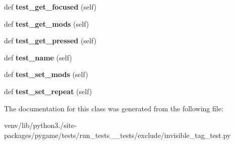 \begin{DoxyCompactItemize}
\item 
\mbox{\label{classpygame_1_1tests_1_1run__tests____tests_1_1exclude_1_1invisible__tag__test_1_1_key_module_test_a1f0f7232340ffbfc27aa881cff69fd75}} 
def {\bfseries test\+\_\+get\+\_\+focused} (self)
\item 
\mbox{\label{classpygame_1_1tests_1_1run__tests____tests_1_1exclude_1_1invisible__tag__test_1_1_key_module_test_ac4b4e299e197507a4015d1b2462cda31}} 
def {\bfseries test\+\_\+get\+\_\+mods} (self)
\item 
\mbox{\label{classpygame_1_1tests_1_1run__tests____tests_1_1exclude_1_1invisible__tag__test_1_1_key_module_test_a3667dfa3751e0672fe489a5ae988f2a2}} 
def {\bfseries test\+\_\+get\+\_\+pressed} (self)
\item 
\mbox{\label{classpygame_1_1tests_1_1run__tests____tests_1_1exclude_1_1invisible__tag__test_1_1_key_module_test_ae739eb93c36af68747980ecf5f705128}} 
def {\bfseries test\+\_\+name} (self)
\item 
\mbox{\label{classpygame_1_1tests_1_1run__tests____tests_1_1exclude_1_1invisible__tag__test_1_1_key_module_test_a95a69e6cbf4de7dc4fcfc860b4041f03}} 
def {\bfseries test\+\_\+set\+\_\+mods} (self)
\item 
\mbox{\label{classpygame_1_1tests_1_1run__tests____tests_1_1exclude_1_1invisible__tag__test_1_1_key_module_test_a51726d9adb7dab186830d59ad637653a}} 
def {\bfseries test\+\_\+set\+\_\+repeat} (self)
\end{DoxyCompactItemize}


The documentation for this class was generated from the following file\+:\begin{DoxyCompactItemize}
\item 
venv/lib/python3./site-\/packages/pygame/tests/run\+\_\+tests\+\_\+\+\_\+tests/exclude/invisible\+\_\+tag\+\_\+test.\+py\end{DoxyCompactItemize}
